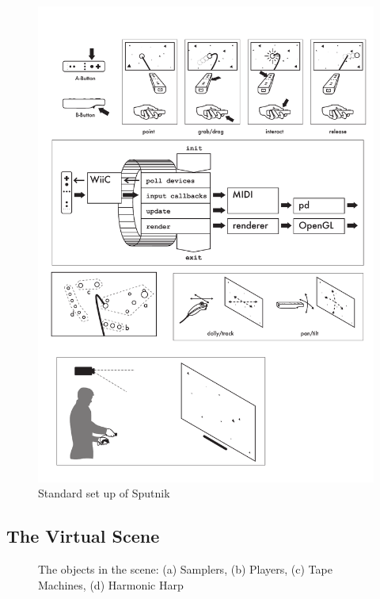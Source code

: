 \documentclass[10pt,a4paper]{scrartcl}
\begin{document}
\begin{figure}[hbtp]
\begin{center}
\includegraphics[width=0.4\columnwidth]{img/setup}
\caption{Standard set up of Sputnik}
\label{fig:sputnik-setup}
\end{center}
\end{figure}




\subsection{The Virtual Scene}

\begin{figure}[hbtp]
\begin{center}
\caption{The objects in the scene: (a) Samplers, (b) Players, (c) Tape Machines, (d) Harmonic Harp}
\label{fig:screen-shot-overview}
\end{center}
\end{figure}
\end{document}

